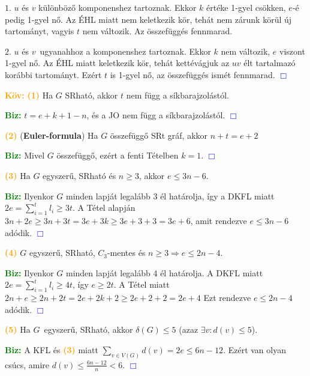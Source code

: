 \documentclass[../szamtud.tex]{subfiles}
\begin{document}
        $\boxed{1.}$ $u$ és $v$ különböző komponenshez tartoznak. Ekkor $k$ értéke 1-gyel csökken, $e$-é pedig 1-gyel nő. Az ÉHL miatt nem keletkezik kör, tehát nem zárunk körül új tartományt, vagyis $t$ nem változik. Az összefüggés fennmarad.

        $\boxed{2.}$ $u$ és $v$ ugyanahhoz a komponenshez tartoznak. Ekkor $k$ nem változik, $e$ viszont 1-gyel nő. Az ÉHL miatt keletkezik kör, tehát kettévágjuk az $uv$ élt tartalmazó korábbi tartományt. Ezért $t$ is 1-gyel nő, az összefüggés ismét fennmarad. \textcolor{blue}{$\Box$}

        \textcolor{orange}{\textbf{Köv:}} \textcolor{orange}{\textbf{(1)}} Ha $G$ SRható, akkor $t$ nem függ a síkbarajzolástól.

        \textcolor{green}{\textbf{Biz:}} $t = e + k + 1 - n$, és a JO nem függ a síkbarajzolástól. \textcolor{blue}{$\Box$}

        \textcolor{orange}{\textbf{(2)}} (\textbf{Euler-formula}) Ha $G$ összefüggő SRt gráf, akkor $n + t = e + 2$

        \textcolor{green}{\textbf{Biz:}} Mivel $G$ összefüggő, ezért a fenti Tételben $k = 1$. \textcolor{blue}{$\Box$}

        \textcolor{orange}{\textbf{(3)}} Ha $G$ egyszerű, SRható és $n \geq 3$, akkor $e \leq 3n - 6$.

        \textcolor{green}{\textbf{Biz:}} Ilyenkor $G$ minden lapját legalább 3 él határolja, így a DKFL miatt $2e = \sum_{i=1}^{t} l_i \geq 3t$. A Tétel alapján $3n + 2e \geq 3n + 3t = 3e + 3k \geq 3e + 3 + 3 = 3e + 6$, amit rendezve $e \leq 3n - 6$ adódik. \textcolor{blue}{$\Box$}

        \textcolor{orange}{\textbf{(4)}} $G$ egyszerű, SRható, $C_3$-mentes és $n \geq 3 \Rightarrow e \leq 2n - 4$. 

        \textcolor{green}{\textbf{Biz:}} Ilyenkor $G$ minden lapját legalább 4 él határolja. A DKFL miatt $2e = \sum_{i=1}^{t}l_i \geq 4t$, így $e \geq 2t$. A Tétel miatt $2n + e \geq 2n + 2t = 2e + 2k + 2 \geq 2e + 2 + 2 = 2e + 4$ Ezt rendezve $e \leq 2n - 4$ adódik. \textcolor{blue}{$\Box$}

        \textcolor{orange}{\textbf{(5)}} Ha $G$ egyszerű, SRható, akkor $\delta(G) \leq 5$ (azaz $\exists v : d(v) \leq 5$).

        \textcolor{green}{\textbf{Biz:}} A KFL és \textcolor{orange}{\textbf{(3)}} miatt $\sum_{v\in V(G)}d(v) = 2e \leq 6n - 12$. Ezért van olyan csúcs, amire $d(v) \leq \frac{6n-12}{n} < 6$. \textcolor{blue}{$\Box$}
\end{document}
